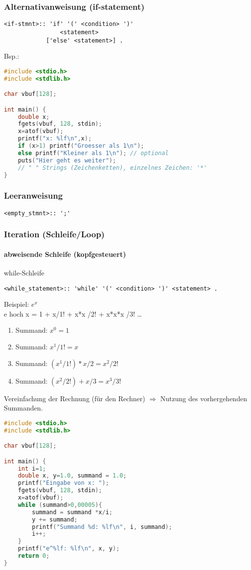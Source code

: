 \subsubsection[Alternativanweisung]{Alternativanweisung (if-statement)}

\begin{lstlisting}
<if-stmnt>:: 'if' '(' <condition> ')' 
				<statement>
			['else' <statement>] .
\end{lstlisting}

Bsp.:
\begin{lstlisting}[language=C]
#include <stdio.h>
#include <stdlib.h>

char vbuf[128];

int main() {
	double x;
	fgets(vbuf, 128, stdin);
	x=atof(vbuf);
	printf("x: %lf\n",x);
	if (x>1) printf("Groesser als 1\n");
	else printf("Kleiner als 1\n");	// optional
	puts("Hier geht es weiter");	
	// " " Strings (Zeichenketten), einzelnes Zeichen: '*'
}
\end{lstlisting}

\subsubsection{Leeranweisung}
\begin{lstlisting}
<empty_stmnt>:: ';'
\end{lstlisting}

\subsubsection[Iteration]{Iteration (Schleife/Loop)}
\paragraph{abweisende Schleife (kopfgesteuert)} while-Schleife
\begin{lstlisting}
<while_statement>:: 'while' '(' <condition> ')' <statement> .
\end{lstlisting}

Beispiel: $e^x$\\
e hoch x = 1 + x/1! + x*x /2! + x*x*x /3! …
\begin{enumerate} [label= \arabic* .]
\item  Summand: $x^0=1$
\item  Summand: $x^1/1! = x$
\item  Summand: $(x^1/1!)*x/2 = x^2/2!$
\item  Summand: $(x^2/2!) + x/3 = x^3/3!$
\end{enumerate}
Vereinfachung der Rechnung (für den Rechner) $\Rightarrow$ Nutzung des vorhergehenden Summanden.
\begin{lstlisting}[language=C]
#include <stdio.h>
#include <stdlib.h>

char vbuf[128];

int main() {
	int i=1;
	double x, y=1.0, summand = 1.0;
	printf("Eingabe von x: ");
	fgets(vbuf, 128, stdin);
	x=atof(vbuf);
	while (summand>0,00005){
		summand = summand *x/i;
		y += summand;
		printf("Summand %d: %lf\n", i, summand);
		i++;
	}
	printf("e^%lf: %lf\n", x, y);
	return 0;
}
\end{lstlisting}


